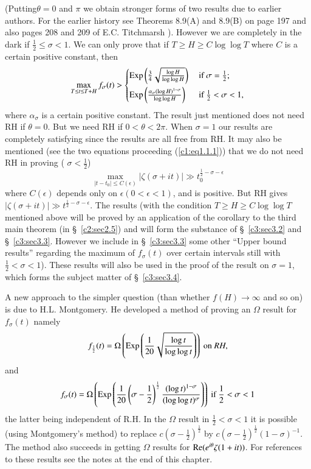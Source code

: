 (Putting\pageoriginale $\theta =0$ and $\pi$ we obtain stronger forms of two results due to earlier authors. For the earlier history see Theorems 8.9(A) and 8.9(B) on page 197 and also pages 208 and 209 of E.C. Titchmarsh \cite{Titchmarsh1}). However we are completely in the dark if $\frac{1}{2} \leq \sigma < 1$. We can only prove that if $T \geq H \geq C \log \log T$ where $C$ is a certain positive constant, then
$$
\max\limits_{T \leq t \leq T + H} f_\sigma (t) > 
\begin{cases}
\operatorname{Exp} \left(\frac{3}{4} \sqrt{\frac{\log H}{\log \log H}} \right) & \text{ if } \sigma = \frac{1}{2};\\[6pt]
\operatorname{Exp}\left(\frac{\alpha_\sigma (\log H)^{1-\sigma}}{\log \log H} \right) & \text{ if } \frac{1}{2} < \sigma < 1,
\end{cases}
$$
where $\alpha_\sigma$ is a certain positive constant. The result just mentioned does not need RH if $\theta = 0$. But we need RH if $0 < \theta < 2\pi$. When $\sigma =1$ our results are completely satisfying since the results are all free from RH. It may also be mentioned (see the two equations proceeding (\ref{c1:eq1.1.1})) that we do not need RH in proving  ( $\sigma < \frac{1}{2}$)
$$
\max\limits_{|t-t_0|\leq C(\epsilon)} |\zeta(\sigma + it)| \gg t^{\frac{1}{2} -\sigma-\epsilon}_0
$$
where $C(\epsilon)$ depends only on $\epsilon (0<\epsilon <1)$, and is positive. But RH gives $|\zeta (\sigma + it)| \gg t^{\frac{1}{2} - \sigma - \epsilon}$. The results (with the condition $T \geq H \geq C \log \log T$ mentioned above will be proved by an application of the corollary to the third main theorem (in \S\ \ref{c2:sec2.5}) and will form the substance of \S\ \ref{c3:sec3.2} and \S\ \ref{c3:sec3.3}. However we include in \S\ \ref{c3:sec3.3} some other ``Upper bound results'' regarding the maximum of $f_\sigma (t)$ over certain intervals still with $\frac{1}{2} < \sigma <1$). These results will also be used in the proof of the result on $\sigma =1$, which forms the subject matter of \S\ \ref{c3:sec3.4}.

A new approach to the simpler question (than whether $f(H) \to \infty$ and so on) is due to H.L. Montgomery. He developed a method of proving an $\Omega$ result for $f_\sigma (t)$ namely
$$
f_{\frac{1}{2}} (t) = \Omega \left( \operatorname{Exp} \left( \frac{1}{20} \sqrt{\frac{\log t}{\log \log t}}\right)\right) \text{ on } RH,
$$
and\pageoriginale 
$$
f_\sigma (t) = \Omega \left( \operatorname{Exp} \left( \frac{1}{20} \left(\sigma -\frac{1}{2} \right)^{\frac{1}{2}} \frac{(\log t)^{1-\sigma}}{(\log \log t)^{\sigma}}\right)\right) \text{ if } \frac{1}{2} < \sigma < 1
$$
the latter being independent of R.H. In the $\Omega$ result in $\frac{1}{2} <\sigma < 1$ it is possible (using Montgomery's method) to replace $c(\sigma -\frac{1}{2})^{\frac{1}{2}}$ by $c (\sigma -\frac{1}{2})^{\frac{1}{2}} (1-\sigma)^{-1}$. The method also succeeds in getting $\Omega$ results for $\operatorname{Re} (e^{i\theta} \zeta(1+ it))$. For references to these results see the notes at the end of this chapter.

